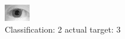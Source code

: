 \begin{figure}[h!]
\begin{center}
\includegraphics[width=0.60\columnwidth]{figures/ID1067_class_2_target_3.png}
\end{center}
\caption{ Classification: 2 actual target: 3}
\label{fig:ID1067_class_2_target_3}
\end{figure}
